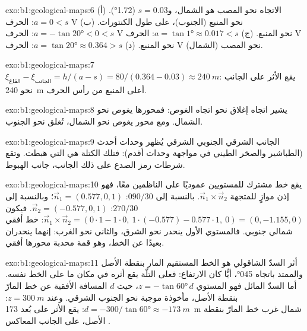 \begin{solution}{exo:b1:geological-maps:6}
الاتجاه نحو المصب هو الشمال، و$s = 0.03$ (\ang{1.72}). (أ) $a = 0 < s$: الحرف V نحو المنبع (الجنوب)، على طول الكنتورات. (ب) $a = -\tan\ang{20} < 0 < s$: الحرف V نحو المنبع. (ج) $a = \tan\ang{1} \approx 0.017 < s$: الحرف V نحو المنبع. (د) $a = \tan\ang{20}
\approx 0.364 > s$: الحرف V نحو المصب (الشمال).
\end{solution}

\begin{solution}{exo:b1:geological-maps:7}
$\xi_{\text{القاع}} - \xi_{\text{الجانب}} = h/(a - s) = 80/(0.364 - 0.03)
\approx \qty{240}{m}$: يقع الأثر على الجانب نحو \qty{240}{m} أعلى المنبع من رأس الحرف.
\end{solution}

\begin{solution}{exo:b1:geological-maps:8}
يشير اتجاه إغلاق  نحو اتجاه الغوص: فمحورها يغوص نحو الشمال. ومع محور يغوص نحو الشمال، تُغلق   نحو الجنوب.
\end{solution}

\begin{solution}{exo:b1:geological-maps:9}
الجانب الشرقي الجنوبي الشرقي يُظهر وحدات أحدث (الطباشير والصخر الطيني في مواجهة وحدات أقدم): فتلك الكتلة هي التي هبطت. وتقع شرطات رمز الصدع على ذلك الجانب، جانب الهبوط.
\end{solution}

\begin{solution}{exo:b1:geological-maps:10}
يقع خط مشترك للمستويين عموديًا على الناظمين معًا، فهو إذن موازٍ للمتجهة $\vec n_1 \times \vec n_2$. بالنسبة إلى $090/30$: $\vec n_1 = (0.577, 0,
1)$؛ وبالنسبة إلى $270/30$: $\vec n_2 = (-0.577, 0, 1)$. فيكون $\vec n_1 \times \vec n_2
= (0\cdot 1 - 1\cdot 0,\ 1\cdot(-0.577) - 0.577\cdot 1,\ 0) = (0, -1.155,
0)$: خط أفقي شمالي جنوبي. فالمستوي الأول ينحدر نحو الشرق، والثاني نحو الغرب: إنهما ينحدران بعيدًا عن الخط، وهو قمة  محدبة محورها أفقي.
\end{solution}

\begin{solution}{exo:b1:geological-maps:11}
أثر السدّ الشاقولي هو الخط المستقيم المار بنقطة الأصل والممتد باتجاه \ang{045}، أيًّا كان الارتفاع: فعلى التلّة يقع أثره في مكان ما على الخط نفسه. أما السدّ المائل فهو المستوي $z = -\tan\ang{60}\,d$، حيث $d$ المسافة الأفقية عن خط  المارّ بنقطة الأصل، مأخوذة موجبة نحو الجنوب الشرقي. وعند $z = \qty{300}{m}$: $d = -300/\tan\ang{60}
\approx \qty{-173}{m}$: يقع الأثر على بُعد \qty{173}{m} شمال غرب خط  المارّ بنقطة الأصل، على الجانب المعاكس .
\end{solution}

